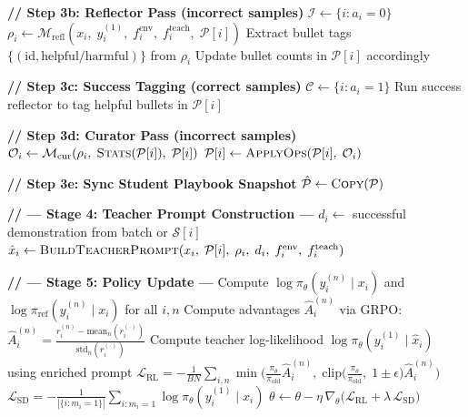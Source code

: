 \documentclass{article}
\begin{document}
\begin{algorithm}[t]
\begin{algorithmic}[1]
            \STATE \textbf{// Step 3b: Reflector Pass (incorrect samples)}
            \STATE $\mathcal{I} \leftarrow \{i : a_i = 0\}$ 
                \STATE $\rho_i \leftarrow \mathcal{M}_{\mathrm{refl}}(x_i,\; y_i^{(1)},\; f_i^{\text{env}},\; f_i^{\text{teach}},\; \mathcal{P}[i])$ 
                \STATE Extract bullet tags $\{(\text{id}, \text{helpful/harmful})\}$ from $\rho_i$
                \STATE Update bullet counts in $\mathcal{P}[i]$ accordingly
            \ENDFOR

            \STATE \textbf{// Step 3c: Success Tagging (correct samples)}
            \STATE $\mathcal{C} \leftarrow \{i : a_i = 1\}$
                \STATE Run success reflector to tag helpful bullets in $\mathcal{P}[i]$
            \ENDFOR

            \STATE \textbf{// Step 3d: Curator Pass (incorrect samples)}
                \STATE $\mathcal{O}_i \leftarrow \mathcal{M}_{\mathrm{cur}}(\rho_i,\; \textsc{Stats}(\mathcal{P}[i]),\; \mathcal{P}[i])$ 
                \STATE $\mathcal{P}[i] \leftarrow \textsc{ApplyOps}(\mathcal{P}[i],\; \mathcal{O}_i)$ 
            \ENDFOR

            \STATE \textbf{// Step 3e: Sync Student Playbook Snapshot}
                \STATE $\hat{\mathcal{P}} \leftarrow \textsc{Copy}(\mathcal{P})$ 
            \ENDIF
        \ENDIF

        \STATE \textbf{// --- Stage 4: Teacher Prompt Construction ---}
            \STATE $d_i \leftarrow$ successful demonstration from batch or $\mathcal{S}[i]$ 
            \STATE $\hat{x}_i \leftarrow \textsc{BuildTeacherPrompt}(x_i,\; \mathcal{P}[i],\; \rho_i,\; d_i,\; f_i^{\text{env}},\; f_i^{\text{teach}})$
        \ENDFOR

        \STATE \textbf{// --- Stage 5: Policy Update ---}
        \STATE Compute $\log \pi_\theta(y_i^{(n)} \mid x_i)$ and $\log \pi_{\text{ref}}(y_i^{(n)} \mid x_i)$ for all $i, n$
        \STATE Compute advantages $\hat{A}_i^{(n)}$ via GRPO: $\hat{A}_i^{(n)} = \frac{r_i^{(n)} - \text{mean}_n(r_i^{(\cdot)})}{\text{std}_n(r_i^{(\cdot)})}$
        \STATE Compute teacher log-likelihood $\log \pi_\theta(y_i^{(1)} \mid \hat{x}_i)$ using enriched prompt
        \STATE $\mathcal{L}_{\text{RL}} = -\frac{1}{BN}\sum_{i,n} \min\!\Big(\frac{\pi_\theta}{\pi_{\text{old}}} \hat{A}_i^{(n)},\; \text{clip}\big(\frac{\pi_\theta}{\pi_{\text{old}}},\; 1\!\pm\!\epsilon\big) \hat{A}_i^{(n)}\Big)$
        \STATE $\mathcal{L}_{\text{SD}} = -\frac{1}{|\{i : m_i\!=\!1\}|}\sum_{i: m_i=1} \log \pi_\theta(y_i^{(1)} \mid \hat{x}_i)$ 
        \STATE $\theta \leftarrow \theta - \eta\,\nabla_\theta\!\big(\mathcal{L}_{\text{RL}} + \lambda\,\mathcal{L}_{\text{SD}}\big)$


\end{algorithmic}
\end{algorithm}
\end{document}
